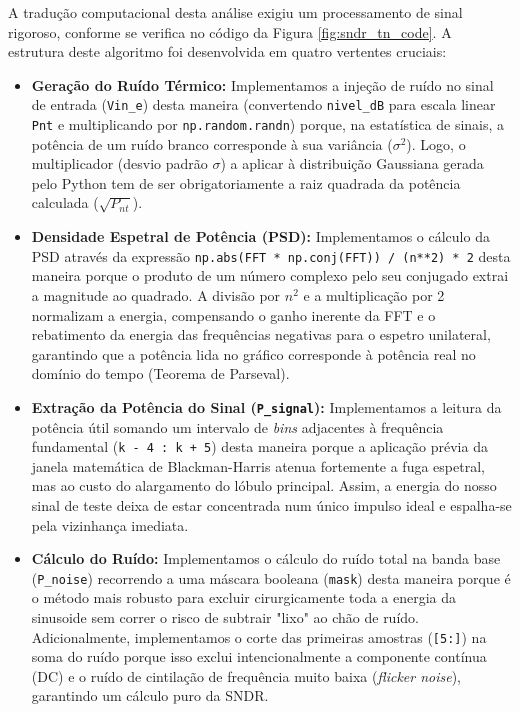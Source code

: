 A tradução computacional desta análise exigiu um processamento de sinal rigoroso, conforme se verifica no código da Figura \ref{fig:sndr_tn_code}. A estrutura deste algoritmo foi desenvolvida em quatro vertentes cruciais:

\begin{itemize}
    \item \textbf{Geração do Ruído Térmico:} Implementamos a injeção de ruído no sinal de entrada
    (\texttt{Vin\_e}) desta maneira (convertendo \texttt{nivel\_dB} para escala linear \texttt{Pnt}
    e multiplicando por \texttt{np.random.randn}) porque, na estatística de sinais, a potência de um
    ruído branco corresponde à sua variância ($\sigma^2$). Logo, o multiplicador (desvio padrão $\sigma$)
    a aplicar à distribuição Gaussiana gerada pelo Python tem de ser obrigatoriamente a raiz quadrada da
    potência calculada ($\sqrt{P_{nt}}$).
    \vspace{0.2cm}
    \item \textbf{Densidade Espetral de Potência (PSD):} Implementamos o cálculo da PSD através da expressão
    \texttt{np.abs(FFT * np.conj(FFT)) / (n**2) * 2} desta maneira porque o produto de um número complexo pelo seu conjugado extrai a magnitude ao quadrado. A divisão por $n^2$ e a multiplicação por 2 normalizam a energia, compensando o ganho inerente da FFT e o rebatimento da energia das frequências negativas para o espetro unilateral, garantindo que a potência lida no gráfico corresponde à potência real no domínio do tempo (Teorema de Parseval).
    \vspace{0.2cm}
    \item \textbf{Extração da Potência do Sinal (\texttt{P\_signal}):} Implementamos a leitura da potência útil somando um intervalo de \textit{bins} adjacentes à frequência fundamental (\texttt{k - 4 : k + 5}) desta maneira porque a aplicação prévia da janela matemática de Blackman-Harris atenua fortemente a fuga espetral, mas ao custo do alargamento do lóbulo principal. Assim, a energia do nosso sinal de teste deixa de estar concentrada num único impulso ideal e espalha-se pela vizinhança imediata.
    \vspace{0.2cm}
    \item \textbf{Cálculo do Ruído:} Implementamos o cálculo do ruído total na banda base (\texttt{P\_noise}) recorrendo a uma máscara booleana (\texttt{mask}) desta maneira porque é o método mais robusto para excluir cirurgicamente toda a energia da sinusoide sem correr o risco de subtrair "lixo" ao chão de ruído. Adicionalmente, implementamos o corte das primeiras amostras (\texttt{[5:]}) na soma do ruído porque isso exclui intencionalmente a componente contínua (DC) e o ruído de cintilação de frequência muito baixa (\textit{flicker noise}), garantindo um cálculo puro da SNDR.
\end{itemize}

